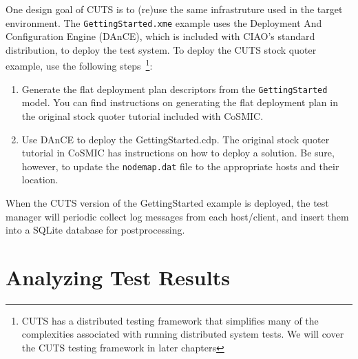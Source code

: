 One design goal of CUTS is to (re)use the same infrastruture used in the 
target environment. The \texttt{GettingStarted.xme} example uses the Deployment 
And Configuration Engine (DAnCE), which is included with CIAO's standard 
distribution, to deploy the test system. To deploy the CUTS stock quoter 
example, use the following steps~\footnote{CUTS has a distributed testing
framework that simplifies many of the complexities associated with running
distributed system tests. We will cover the CUTS testing framework in later
chapters}:
\begin{enumerate}
  \item Generate the flat deployment plan descriptors from the 
  \texttt{GettingStarted}  model. You can find instructions on generating 
  the flat deployment plan in the original stock quoter tutorial included 
  with CoSMIC.
  
  \item Use DAnCE to deploy the GettingStarted.cdp. The original stock 
  quoter tutorial in CoSMIC has instructions on how to deploy a solution. 
  Be sure, however, to update the \texttt{nodemap.dat} file to the appropriate
  hosts and their location.
\end{enumerate}
When the CUTS version of the GettingStarted example is deployed, the test
manager will periodic collect log messages from each host/\-client, and 
insert them into a SQLite database for postprocessing.

\section{Analyzing Test Results}
\label{sec:quickstart-analysis}


